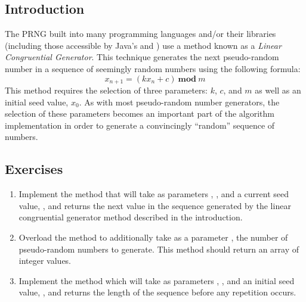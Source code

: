 		\subsection{Introduction}
			The PRNG built into many programming languages and/or their libraries (including those accessible by Java's  and ) use a method known as a \emph{Linear Congruential Generator}. This technique generates the next pseudo-random number in a sequence of seemingly random numbers using the following formula:
			\[	x_{n + 1} = (kx_{n} + c)\ \mathbf{mod}\ m \]
			This method requires the selection of three parameters: $k$, $c$, and $m$ as well as an initial seed value, $x_0$. As with most pseudo-random number generators, the selection of these parameters becomes an important part of the algorithm implementation in order to generate a convincingly ``random'' sequence of numbers.
			\ \\[18pt]

		\subsection{Exercises}
			\begin{enumerate}
				\item Implement the  method that will take as parameters , ,  and a current seed value, , and returns the next value in the sequence generated by the linear congruential generator method described in the introduction.
				\item Overload the  method to additionally take as a parameter , the number of pseudo-random numbers to generate. This method should return an array of  integer values.
	      \item Implement the  method which will take as parameters , ,  and an initial seed value, , and returns the length of the sequence before any repetition occurs.
			\end{enumerate}

